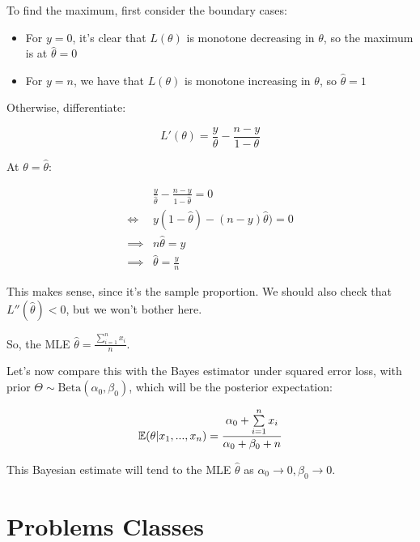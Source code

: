 \documentclass[a4paper]{article}
\begin{document}
            To find the maximum, first consider the boundary cases:

            \begin{itemize}
                \item For $y = 0$, it's clear that $L(\theta)$ is monotone
                    decreasing in $\theta$, so the maximum is at $\widehat
                    \theta = 0$
                \item For $y = n$, we have that $L(\theta)$ is monotone
                    increasing in $\theta$, so $\widehat \theta = 1$
            \end{itemize}

            Otherwise, differentiate:

            \[
                L'(\theta) = \frac{y}{\theta} - \frac{n - y}{1 - \theta}
            \]

            At $\theta = \widehat \theta$:

            \begin{align*}
                & \frac{y}{\widehat \theta} - \frac{n - y}{1 - \widehat \theta}
                    = 0 \\
                \iff & y(1 - \widehat \theta) - (n - y)\widehat \theta) = 0 \\
                \implies & n\widehat \theta = y \\
                \implies & \widehat \theta = \frac{y}{n}
            \end{align*}

            This makes sense, since it's the sample proportion. We should also
            check that $L''(\widehat \theta) < 0$, but we won't bother here.

            So, the MLE $\widehat \theta = \frac{\sum\limits_{i=1}^n x_i}{n}$.

            Let's now compare this with the Bayes estimator under squared error
            loss, with prior $\Theta \sim \text{Beta}(\alpha_0, \beta_0)$, which
            will be the posterior expectation:

            \[
                \mathbb{E}(\theta | x_1, ..., x_n) = \frac{\alpha_0 +
                \sum\limits_{i=1}^n x_i}{\alpha_0 + \beta_0 + n}
            \]

            This Bayesian estimate will tend to the MLE $\widehat \theta$ as
            $\alpha_0 \to 0, \beta_0 \to 0$.

    \newpage
    \section*{Problems Classes}
\end{document}
